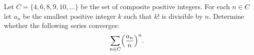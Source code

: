 \documentclass{article}
\begin{document}
\setlength{\parindent}{0pt}
Let \(\displaystyle C=\{4,6,8,9,10,\ldots\}\) be the set of composite positive integers. For each \(\displaystyle n\in C\) let \(\displaystyle a_n\) be the smallest positive integer \(\displaystyle k\) such that \(\displaystyle k!\) is divisible by  \(\displaystyle n\).  Determine whether the following series converges:$$\sum_{n\in C}\Bigl(\frac{a_n}{n}\Bigr)^n.$$
\end{document}
